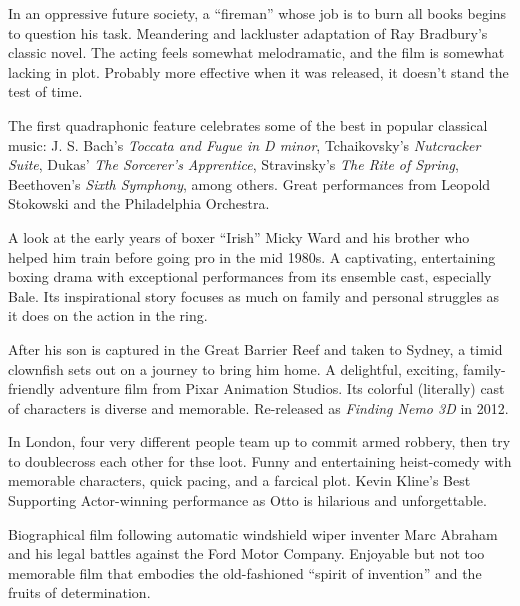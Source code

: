    In an oppressive future society, a ``fireman'' whose job is to burn all books begins to question his task. Meandering and lackluster adaptation of Ray Bradbury's classic novel. The acting feels somewhat melodramatic, and the film is somewhat lacking in plot. Probably more effective when it was released, it doesn't stand the test of time. \author{DW}

  The first quadraphonic feature celebrates some of the best in popular classical music: J. S. Bach's \textit{Toccata and Fugue in D minor}, Tchaikovsky's \textit{Nutcracker Suite}, Dukas' \textit{The Sorcerer's Apprentice}, Stravinsky's \textit{The Rite of Spring}, Beethoven's \textit{Sixth Symphony}, among others. Great performances from Leopold Stokowski and the Philadelphia Orchestra.\author{AW}

\iffalse
\movie{Fargo}{1996}{98m}{\four}
\fi

   A look at the early years of boxer ``Irish'' Micky Ward and his brother who helped him train before going pro in the mid 1980s. A captivating, entertaining boxing drama with exceptional performances from its ensemble cast, especially Bale. Its inspirational story focuses as much on family and personal struggles as it does on the action in the ring. \author{DW} 

   After his son is captured in the Great Barrier Reef and taken to Sydney, a timid clownfish sets out on a journey to bring him home. A delightful, exciting, family-friendly adventure film from Pixar Animation Studios. Its colorful (literally) cast of characters is diverse and memorable. Re-released as \textit{Finding Nemo 3D} in 2012. \author{DW} 

   In London, four very different people team up to commit armed robbery, then try to doublecross each other for thse loot. Funny and entertaining heist-comedy with memorable characters, quick pacing, and a farcical plot. Kevin Kline's Best Supporting Actor-winning performance as Otto is hilarious and unforgettable. \author{DW} 

   Biographical film following automatic windshield wiper inventer Marc Abraham and his legal battles against the Ford Motor Company. Enjoyable but not too memorable film that embodies the old-fashioned ``spirit of invention'' and the fruits of determination. \author{DW} 
